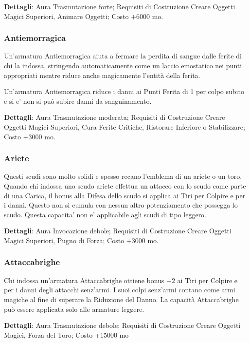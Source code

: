 \begin{multicols}{2}
\textbf{Dettagli}: Aura Trasmutazione forte; Requisiti di Costruzione Creare Oggetti Magici Superiori, Animare Oggetti; Costo +6000 mo.

\subsubsection{Antiemorragica}

Un'armatura Antiemorragica aiuta a fermare la perdita di sangue dalle ferite di chi la indossa, stringendo automaticamente come un laccio emostatico nei punti appropriati mentre riduce anche magicamente l'entità della ferita.

Un'armatura Antiemorragica riduce i danni ai Punti Ferita di 1 per colpo subito e si e' non si può subire danni da sanguinamento. 

\textbf{Dettagli}: Aura Trasmutazione moderata; Requisiti di Costruzione Creare Oggetti Magici Superiori, Cura Ferite Critiche, Ristorare Inferiore o Stabilizzare; Costo +3000 mo.

\subsubsection{Ariete}

Questi scudi sono molto solidi e spesso recano l'emblema di un ariete o un toro. Quando chi indossa uno scudo ariete effettua un attacco con lo scudo come parte di una Carica, il bonus alla Difesa dello scudo si applica ai Tiri per Colpire e per i danni. Questo non si cumula con nessun altro potenziamento che possegga lo scudo. Questa capacita' non e' applicabile agli scudi di tipo leggero.

\textbf{Dettagli}: Aura Invocazione debole; Requisiti di Costruzione Creare Oggetti Magici Superiori, Pugno di Forza; Costo +3000 mo.


\subsubsection{Attaccabrighe}

Chi indossa un'armatura Attaccabrighe ottiene bonus +2 ai Tiri per Colpire e per i danni degli attacchi senz'armi. I suoi colpi senz'armi contano come armi magiche al fine di superare la Riduzione del Danno. La capacità Attaccabrighe può essere applicata solo alle armature leggere.

\textbf{Dettagli}: Aura Trasmutazione debole; Requisiti di Costruzione Creare Oggetti Magici, Forza del Toro; Costo +15000 mo


\end{multicols}
